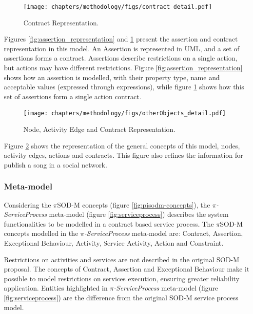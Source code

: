   
 
   \begin{figure}[ht!]
\centering
\texttt{[image: chapters/methodology/figs/contract\_detail.pdf]}
\caption{Contract Representation.}
\label{fig:contract_representation}
\end{figure}

Figures \ref{fig:assertion_representation} and \ref{fig:contract_representation}
present the assertion and contract representation in this
model. An Assertion is represented in UML, and a set of assertions forms a
contract. Assertions describe restrictions on a single action, but actions may
have different restrictions. Figure \ref{fig:assertion_representation} shows how an assertion is modelled, with their property type, name and acceptable values (expressed through
expressions), while figure \ref{fig:contract_representation} shows how this set
of assertions form a single action contract.     

   \begin{figure}[ht!]
\centering
\texttt{[image: chapters/methodology/figs/otherObjects\_detail.pdf]}
\caption{Node, Activity Edge and Contract Representation.}
\label{fig:other_representation}
\end{figure}

Figure \ref{fig:other_representation} shows the representation of the general
concepts of this model, nodes, activity edges, actions and contracts. This figure also refines the information
for publish a song in a social network.
  

 \subsubsection{Meta-model} 


Considering the $\pi$SOD-M concepts (figure \ref{fig:pisodm-concepts}), the
\textit{$\pi$-ServiceProcess} meta-model (figure \ref{fig:serviceprocess})
describes the system functionalities to be modelled in a contract based service
process. The $\pi$SOD-M concepts modelled in the \textit{$\pi$-ServiceProcess}
meta-model are: {\sc Contract, Assertion, Exceptional Behaviour, Activity,
Service Activity, Action} and {\sc Constraint}.
 


Restrictions on activities and services are not described in the
original SOD-M proposal. The concepts of {\sc Contract, Assertion} and
{\sc Exceptional Behaviour} make it possible to model restrictions on services
execution, ensuring greater reliability application. Entities highlighted in
\textit{$\pi$-ServiceProcess} meta-model (figure \ref{fig:serviceprocess})  are
the difference from the original SOD-M service process model.

